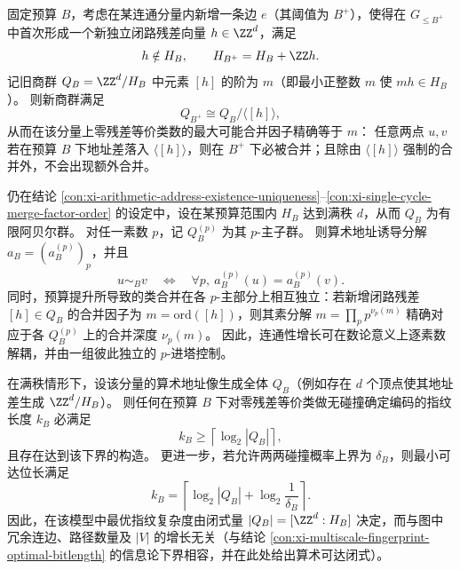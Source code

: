\begin{conclusion}\label{con:xi-single-cycle-merge-factor-order}
固定预算 \(B\)，考虑在某连通分量内新增一条边 \(e\)（其阈值为 \(B^+\)），使得在 \(G_{\le B^+}\) 中首次形成一个新独立闭路残差向量 \(h\in\ZZ^d\)，满足
\[
h\notin H_B,
\qquad
H_{B^+}=H_B+\ZZ h.
\]
记旧商群 \(Q_B=\ZZ^d/H_B\) 中元素 \([h]\) 的阶为 \(m\)（即最小正整数 \(m\) 使 \(mh\in H_B\)）。
则新商群满足
\[
Q_{B^+}\cong Q_B/\langle [h]\rangle,
\]
从而在该分量上零残差等价类数的最大可能合并因子精确等于 \(m\)：
任意两点 \(u,v\) 若在预算 \(B\) 下地址差落入 \(\langle[h]\rangle\)，则在 \(B^+\) 下必被合并；且除由 \(\langle[h]\rangle\) 强制的合并外，不会出现额外合并。
\end{conclusion}

\begin{conclusion}\label{con:xi-prime-decomposition-independence}
仍在结论 \ref{con:xi-arithmetic-address-existence-uniqueness}--\ref{con:xi-single-cycle-merge-factor-order} 的设定中，设在某预算范围内 \(H_B\) 达到满秩 \(d\)，从而 \(Q_B\) 为有限阿贝尔群。
对任一素数 \(p\)，记 \(Q_B^{(p)}\) 为其 \(p\)-主子群。
则算术地址诱导分解 \(a_B=(a_B^{(p)})_p\)，并且
\[
u\sim_B v\quad\Longleftrightarrow\quad
\forall p,\ a_B^{(p)}(u)=a_B^{(p)}(v).
\]
同时，预算提升所导致的类合并在各 \(p\)-主部分上相互独立：若新增闭路残差 \([h]\in Q_B\) 的合并因子为 \(m=\mathrm{ord}([h])\)，则其素分解
\(
m=\prod_p p^{\nu_p(m)}
\)
精确对应于各 \(Q_B^{(p)}\) 上的合并深度 \(\nu_p(m)\)。
因此，连通性增长可在数论意义上逐素数解耦，并由一组彼此独立的 \(p\)-进塔控制。
\end{conclusion}

\begin{conclusion}\label{con:xi-optimal-fingerprint-bitlength-arithmetic-closed-form}
在满秩情形下，设该分量的算术地址像生成全体 \(Q_B\)（例如存在 \(d\) 个顶点使其地址差生成 \(\ZZ^d/H_B\)）。
则任何在预算 \(B\) 下对零残差等价类做无碰撞确定编码的指纹长度 \(k_B\) 必满足
\[
k_B\ge \left\lceil\log_2|Q_B|\right\rceil,
\]
且存在达到该下界的构造。
更进一步，若允许两两碰撞概率上界为 \(\delta_B\)，则最小可达位长满足
\[
k_B=\left\lceil\log_2|Q_B|+\log_2\frac1{\delta_B}\right\rceil.
\]
因此，在该模型中最优指纹复杂度由闭式量
\(
|Q_B|=[\ZZ^d:H_B]
\)
决定，而与图中冗余连边、路径数量及 \(|V|\) 的增长无关（与结论 \ref{con:xi-multiscale-fingerprint-optimal-bitlength} 的信息论下界相容，并在此处给出算术可达闭式）。
\end{conclusion}

